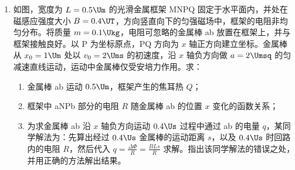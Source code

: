 \documentclass[\gkver]{gaokaozhenti}
\begin{document}
\begin{enumerate}
{$N_{2} = Mg + N_{1}\cos\theta + f_{1}\sin\theta = 67.6\UN$。

（3）木块在下滑过程中，沿斜面方向合力及该力做的功为

$F = mg\sin\theta - f_{1} = 4\UN$，

$W = FL = 16\UJ$，

木块末速度及动能增量 $v = at = 4\Ums$，$\Delta E_{k} = \frac{1}{2}mv^{2} = 16\UJ$，

由此可知下滑过程中 $W = \Delta E_{k}$，即合力做功或外力对木块做的总功等于动能的变化（增加），动能定理成立。
}

\item
如图，宽度为 $L = 0.5\Um$ 的光滑金属框架 MNPQ 固定于水平面内，并处在磁感应强度大小 $B = 0.4\UT$，方向竖直向下的匀强磁场中，框架的电阻非均匀分布。将质量 $m = 0.1\Ukg$，电阻可忽略的金属棒 ab 放置在框架上，并与框架接触良好。以 P 为坐标原点，PQ 方向为 $x$ 轴正方向建立坐标。金属棒从 $x_{0} = 1\Um$ 处以 $v_{0} = 2\Ums$ 的初速度，沿 $x$ 轴负方向做 $a = 2\Umsq$ 的匀减速直线运动，运动中金属棒仅受安培力作用。求：
\begin{enumerate}
	\item
	金属棒 ab 运动 $0.5\Um$，框架产生的焦耳热 $Q$；
	\item
	框架中 aNPb 部分的电阻 $R$ 随金属棒 ab 的位置 $x$ 变化的函数关系；
	\item
	为求金属棒 ab 沿 $x$ 轴负方向运动 $0.4\Us$ 过程中通过 ab 的电量 $q$，某同学解法为：先算出经过 $0.4\Us$ 金属棒的运动距离 $s$，以及 $0.4\Us$ 时回路内的电阻 $R$，然后代入 $q = \frac{\Delta \Phi}{R} = \frac{BLs}{R}$ 求解。指出该同学解法的错误之处，并用正确的方法解出结果。
\end{enumerate}
\onepicture[align=right, w=6.39cm]{}
\end{enumerate}
\end{document}
